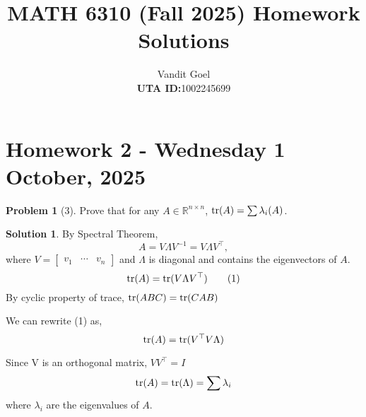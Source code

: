 \documentclass{amsart}[11pt]
\title{MATH 6310 (Fall 2025) Homework Solutions}
\author{Vandit Goel\\\textbf{UTA ID:}1002245699\\}
\theoremstyle{definition}
\newtheorem*{problem}{Problem}
\newtheorem*{solution}{Solution}
\newcommand{\R}{\mathbb{R}}
\newcommand{\tr}{\textnormal{tr}}
\begin{document}
\maketitle

\section{Homework 2 - Wednesday  1 October, 2025}

\begin{problem}[3]
Prove that for any $A\in\R^{n\times n}$, $\tr(A) = \sum\lambda_i(A)$.
\begin{solution}
    By Spectral Theorem,
\[ A = V\Lambda V^{-1} = V\Lambda V^\top , \]
where $V = \begin{bmatrix} v_1 & \cdots & v_n\end{bmatrix}$ and $\Lambda$ is diagonal and contains the eigenvectors of $A$.
\[\tr(A) = \tr(V\Lambda V^\top)\tag{1}\]
By cyclic property of trace, $\tr(ABC) = \tr(CAB)$

We can rewrite (1) as,
\[\tr(A) = \tr(V^\top V\Lambda)\]

Since V is an orthogonal matrix, $VV^\top = I$
\[\tr(A) = \tr(\Lambda) = \sum\lambda_i\]
where $\lambda_i$ are the eigenvalues of $A$.
\end{solution}
\end{problem}
\end{document}
